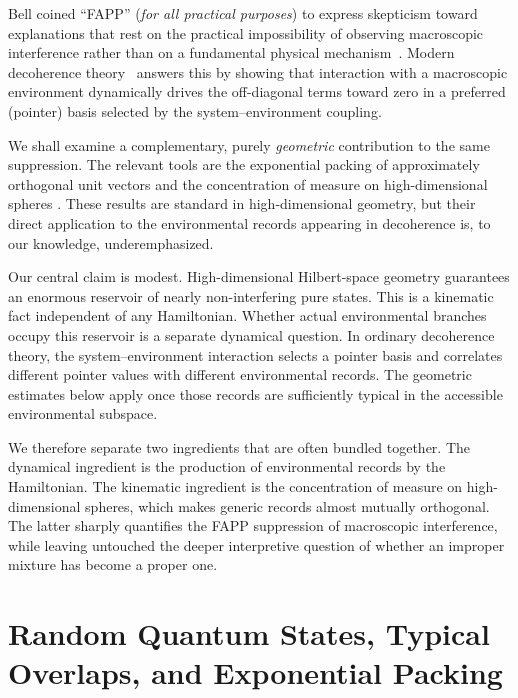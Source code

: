 \documentclass[aps,pra,reprint,superscriptaddress,nofootinbib,longbibliography]{revtex4-2}
\begin{document}
Bell coined ``FAPP'' (\emph{for all practical purposes}) to express skepticism toward explanations that rest on the practical impossibility of observing macroscopic interference rather than on a fundamental physical mechanism~\cite{bell-a}. Modern decoherence theory~\cite{joos1985emergence,RevModPhys.75.715,joos2003decoherence,schlosshauer-2007} answers this by showing that interaction with a macroscopic environment dynamically drives the off-diagonal terms toward zero in a preferred (pointer) basis selected by the system--environment coupling.

We shall examine a complementary, purely \emph{geometric}
contribution to the same suppression.  The relevant tools are the
exponential packing of approximately orthogonal unit vectors and the
concentration of measure on high-dimensional spheres
\cite{kainen1993quasiorthogonal,tao2012topics,vershynin2018high,ledoux2001concentration,milman1986asymptotic}.  These results are
standard in high-dimensional geometry, but their direct application to
the environmental records appearing in decoherence is, to our knowledge,
underemphasized.

Our central claim is modest. High-dimensional Hilbert-space geometry guarantees an enormous reservoir of nearly non-interfering pure states. This is a kinematic fact independent of any Hamiltonian. Whether actual environmental branches occupy this reservoir is a separate dynamical question. In ordinary decoherence theory, the system--environment interaction selects a pointer basis and correlates different pointer values with different environmental records. The geometric estimates below apply once those records are sufficiently typical in the accessible environmental subspace.

We therefore separate two ingredients that are often bundled together. The dynamical ingredient is the production of environmental records by the Hamiltonian. The kinematic ingredient is the concentration of measure on high-dimensional spheres, which makes generic records almost mutually orthogonal. The latter sharply quantifies the FAPP suppression of macroscopic interference, while leaving untouched the deeper interpretive question of whether an improper mixture has become a proper one.


\section{Random Quantum States, Typical Overlaps, and Exponential Packing}
\label{sec:random-overlaps-packing}
\end{document}
